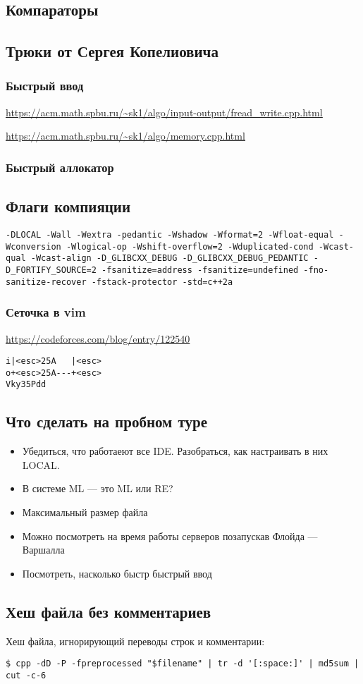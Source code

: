 \subsection{Компараторы}

\subsection{Трюки от Сергея Копелиовича}
\subsubsection{Быстрый ввод}
\underline{\url{https://acm.math.spbu.ru/~sk1/algo/input-output/fread_write.cpp.html}}

\underline{\url{https://acm.math.spbu.ru/~sk1/algo/memory.cpp.html}}
\subsubsection{Быстрый аллокатор}

\subsection{Флаги компияции}
\texttt{-DLOCAL -Wall -Wextra -pedantic -Wshadow -Wformat=2 -Wfloat-equal -Wconversion -Wlogical-op -Wshift-overflow=2 -Wduplicated-cond -Wcast-qual -Wcast-align -D\_GLIBCXX\_DEBUG -D\_GLIBCXX\_DEBUG\_PEDANTIC -D\_FORTIFY\_SOURCE=2 -fsanitize=address -fsanitize=undefined -fno-sanitize-recover -fstack-protector -std=c++2a}
\subsubsection{Сеточка в vim}
\underline{\url{https://codeforces.com/blog/entry/122540}}

\begin{lstlisting}
i|<esc>25A   |<esc>
o+<esc>25A---+<esc>
Vky35Pdd
\end{lstlisting}
\subsection{Что сделать на пробном туре}
\begin{itemize}
\item Убедиться, что работаеют все IDE.
Разобраться, как настраивать в них LOCAL.
\item В системе ML --- это ML или RE?
\item Максимальный размер файла
\item Можно посмотреть на время работы серверов позапускав Флойда --- Варшалла
\item Посмотреть, насколько быстр быстрый ввод
\end{itemize}
\subsection{Хеш файла без комментариев}
Хеш файла, игнорирующий переводы строк и комментарии:
\begin{lstlisting}
$ cpp -dD -P -fpreprocessed "$filename" | tr -d '[:space:]' | md5sum | cut -c-6
\end{lstlisting}
